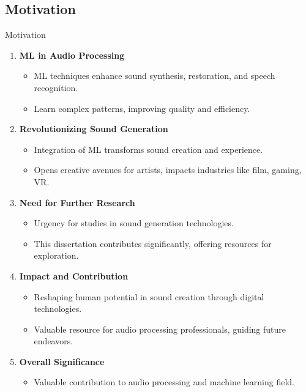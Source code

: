 \subsection{Motivation}

\begin{frame}{Motivation}
    \begin{enumerate}
        \item \textbf{ML in Audio Processing}
              \begin{itemize}
                  \item ML techniques enhance sound synthesis, restoration, and speech recognition.
                  \item Learn complex patterns, improving quality and efficiency.
              \end{itemize}
        \item \textbf{Revolutionizing Sound Generation}
              \begin{itemize}
                  \item Integration of ML transforms sound creation and experience.
                  \item Opens creative avenues for artists, impacts industries like film, gaming, VR.
              \end{itemize}
        \item \textbf{Need for Further Research}
              \begin{itemize}
                  \item Urgency for studies in sound generation technologies.
                  \item This dissertation contributes significantly, offering resources for exploration.
              \end{itemize}
        \item \textbf{Impact and Contribution}
              \begin{itemize}
                  \item Reshaping human potential in sound creation through digital technologies.
                  \item Valuable resource for audio processing professionals, guiding future endeavors.
              \end{itemize}
        \item \textbf{Overall Significance}
              \begin{itemize}
                  \item Valuable contribution to audio processing and machine learning field.
              \end{itemize}
    \end{enumerate}
\end{frame}

